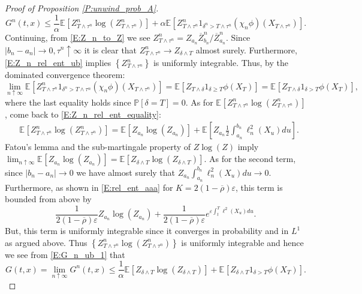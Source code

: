 \documentclass[11pt, letterpaper]{amsart}
\theoremstyle{definition}
\theoremstyle{remark}
\numberwithin{equation}{section}
\newcommand{\eps}{\varepsilon}
\newcommand{\prob}{\mathbb{P}}
\newcommand{\esp}{\mathbb{E}}
\newcommand{\espalt}[2]{\esp^{#1}\bra{#2}}
\newcommand{\bra}[1]{\left[#1\right]}
\newcommand{\cbra}[1]{\left\{#1\right\}}
\newcommand{\ol}[1]{\overline{#1}}
\begin{document}
\begin{proof}[Proof of Proposition \ref{P:unwind_prob_A}]
\begin{equation}
G^n(t,x) \leq \frac{1}{\alpha}\espalt{}{Z^n_{T\wedge\tau^n}\log\left(Z^n_{T\wedge\tau^n}\right)} + \alpha\espalt{}{Z^n_{T\wedge\tau^n}1_{\delta^n>T\wedge\tau^n}(\chi_n\phi)(X_{T\wedge\tau^n})}.
\end{equation}
Continuing, from \eqref{E:Z_n_to_Z} we see $Z^n_{T\wedge\tau^n} = Z_{a_n}\ol{Z}^n_{b_n}/\ol{Z}^n_{a_n}$. Since $|b_n-a_n|\rightarrow 0, \tau^n\uparrow\infty$ it is clear that $Z^n_{T\wedge\tau^n}\rightarrow Z_{\delta\wedge T}$ almost surely.  Furthermore, \eqref{E:Z_n_rel_ent_ub} implies $\cbra{Z^n_{T\wedge\tau^n}}$ is uniformly integrable.  Thus, by the dominated convergence theorem:
\begin{equation*}
\lim_{n\uparrow\infty}\espalt{}{Z^n_{T\wedge\tau^n}1_{\delta^n>T\wedge\tau^n}(\chi_n\phi)(X_{T\wedge\tau^n})} = \espalt{}{Z_{T\wedge\delta}1_{\delta\geq T}\phi(X_{T})} = \espalt{}{Z_{T\wedge\delta}1_{\delta >  T}\phi(X_{T})},
\end{equation*}
where the last equality holds since $\prob\bra{\delta = T} = 0$. As for $\espalt{}{Z^n_{T\wedge\tau^n}\log\left(Z^n_{T\wedge\tau^n}\right)}$, come back to \eqref{E:Z_n_rel_ent_equality}:
\begin{equation*}
\begin{split}
&\espalt{}{Z^n_{T\wedge\tau^n}\log\left(Z^n_{T\wedge\tau^n}\right)}= \espalt{}{Z_{a_n}\log\left(Z_{a_n}\right)} + \espalt{}{Z_{a_n}\frac{1}{2}\int_{a_n}^{b_n} \ell_n^2(X_u)du}.
\end{split}
\end{equation*}
Fatou's lemma and the sub-martingale property of $Z\log(Z)$ imply $\lim_{n\uparrow\infty} \espalt{}{Z_{a_n}\log\left(Z_{a_n}\right)} = \espalt{}{Z_{\delta\wedge T}\log\left(Z_{\delta\wedge T}\right)}$. As for the second term, since $|b_n-a_n|\rightarrow 0$ we have almost surely that $Z_{a_n}\int_{a_n}^{b_n} \ell_n^2(X_u)du \rightarrow 0$. Furthermore, as shown in \eqref{E:rel_ent_aaa} for $K=2(1-\ol{\rho})\eps$, this term is bounded from above by
\begin{equation*}
\frac{1}{2(1-\ol{\rho})\eps}Z_{a_n}\log\left(Z_{a_n}\right) + \frac{1}{2(1-\ol{\rho})\eps}e^{\eps\int_{t}^{T}\ell^2(X_u)du}.
\end{equation*}
But, this term is uniformly integrable since it converges in probability and in $L^1$ as argued above.  Thus $\cbra{Z^n_{T\wedge\tau^n}\log(Z^n_{T\wedge\tau^n})}$ is uniformly integrable and hence we see from \eqref{E:G_n_ub_1} that
\begin{equation*}
G(t,x) = \lim_{n\uparrow\infty} G^n(t,x) \leq \frac{1}{\alpha}\espalt{}{Z_{\delta\wedge T}\log\left(Z_{\delta\wedge T}\right)} + \espalt{}{Z_{\delta\wedge T}1_{\delta>T}\phi(X_T)}.

\end{equation*}
\end{proof}
\end{document}
